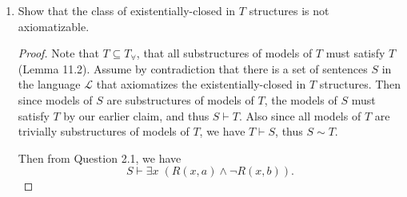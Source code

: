 \documentclass{article}
\begin{document}
\begin{enumerate}[label={\bf Q\arabic*:}]
\begin{enumerate}
        \begin{proof}
          Let $\mathcal{L}'=\mathcal{L}(\mathcal{M})\cup\{b\}$, where $b$
          is a constant that does not appear in $\mathcal{L}(\mathcal{M})$.
          Let
          \[\begin{array}{rrl}
            T' &:= &T_\mathcal{M} \\
              &&\cup \{c_m\neq c_n:m\neq n\in M\} \\
              &&\cup\{R(c_m,b):m\in R(M,a)\} \\
              &&\cup\{b\neq f^n(a):n\in\mathbb{N}\}
          \end{array}\]
          be a theory in the language $\mathcal{L}'$. We show that
          $T'$ is finitely satisfied by $\mathcal{M}$: Assign each $c_m$ to
          $m\in M$. Then clearly $\mathcal{M}$ satisfies all sentences in
          $T_\mathcal{M}$ and also formulas of the form $c_m\neq c_n\in
          T'$ by definition. Given a finite set of formulas
          $\{b\neq f^{0}(a),\ldots,b\neq f^{n}(a)\}\subset T'$, assign $b$
          to $f^{n+1}(a)\in M$. This assignment will satisfy formulas of
          the form $R(c_m,b)\in T'$ for each $m\in R(M,a)$ because $R(m,a)$
          implies $R(m,f^{n+1}(a))$ by induction on $n$. Also, since
          $f^{n+1}(a)\neq f^i(a)$ for all $i<n+1$, the assignment will also
          satisfy the chosen finite set of formulas. \\

          Thus by Compactness theorem $T'$ is satisfied by some model
          $\mathcal{N}$. Then since $T\subset T'$ and $T_\mathcal{M}\subset
          T'$, $\mathcal{N}$ is an elementary extension of $\mathcal{M}$ in
          the original language $\mathcal{L}$, and also
          $\mathcal{N}\models\forall x\; [R(x,a)\rightarrow R(x,b)]$ by our
          choice of $T'$.
        \end{proof}

      \item Show that the class of existentially-closed in $T$ structures
        is not axiomatizable.
        \begin{proof}
          Note that $T\subseteq T_\forall$,
          that all substructures of models of $T$ must satisfy $T$ (Lemma
          11.2). Assume by contradiction that there is a set of sentences
          $S$ in the language $\mathcal{L}$ that axiomatizes the
          existentially-closed in $T$ structures. Then since models of $S$
          are substructures of models of $T$, the models of $S$ must
          satisfy $T$ by our earlier claim, and thus $S\vdash T$. Also
          since all models of $T$ are trivially substructures of models of
          $T$, we have $T\vdash S$, thus $S\sim T$.

          Then from Question 2.1, we
          have
          \[S\vdash \exists x\; (R(x,a)\wedge\neg R(x,b)).\]
        \end{proof}
    \end{enumerate}
\end{enumerate}
\end{document}
